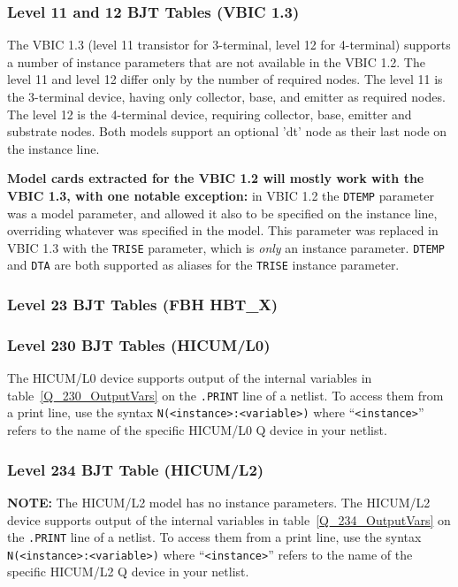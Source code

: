 \subsubsection{Level 11 and 12 BJT Tables (VBIC 1.3)}
The VBIC 1.3 (level 11 transistor for 3-terminal, level 12 for
4-terminal) supports a number of instance parameters that are not
available in the VBIC 1.2.  The level 11 and level 12 differ only by
the number of required nodes.  The level 11 is the 3-terminal device,
having only collector, base, and emitter as required nodes.  The level
12 is the 4-terminal device, requiring collector, base, emitter and
substrate nodes.  Both models support an optional 'dt' node as their
last node on the instance line.

\textbf{Model cards extracted for the VBIC 1.2 will mostly work with the VBIC
1.3,  with one notable exception:} in VBIC 1.2 the \texttt{DTEMP} parameter was
a model parameter, and \Xyce{} allowed it also to be specified on the instance
line, overriding whatever was specified in the model.  This parameter was
replaced in VBIC 1.3 with the \texttt{TRISE} parameter, which is {\em only\/}
an instance parameter.  \texttt{DTEMP} and \texttt{DTA} are both supported as
aliases for the \texttt{TRISE} instance parameter.



\clearpage


\clearpage

\subsubsection{Level 23 BJT Tables (FBH HBT\_X)}


\clearpage

\subsubsection{Level 230 BJT Tables (HICUM/L0)}
The HICUM/L0 device supports output of the internal variables in
table~\ref{Q_230_OutputVars} on the \texttt{.PRINT} line of a netlist.
To access them from a print line, use the syntax
\texttt{N(<instance>:<variable>)} where ``\texttt{<instance>}'' refers to the
name of the specific HICUM/L0 Q device in your netlist.




\clearpage

\subsubsection{Level 234 BJT Table (HICUM/L2)}
\textbf{NOTE:} The HICUM/L2 model has no instance parameters.
The HICUM/L2 device supports output of the internal variables in
table~\ref{Q_234_OutputVars} on the \texttt{.PRINT} line of a netlist.
To access them from a print line, use the syntax
\texttt{N(<instance>:<variable>)} where ``\texttt{<instance>}'' refers to the
name of the specific HICUM/L2 Q device in your netlist.


\clearpage

